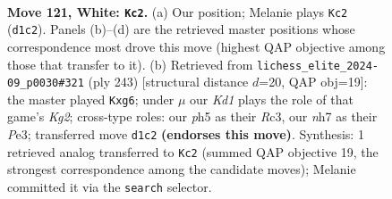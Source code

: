 \documentclass[11pt]{article}
\begin{document}
\begin{figure}[p]\centering
\begin{subfigure}{0.46\textwidth}\centering
\resizebox{\linewidth}{!}{%
\newchessgame
\chessboard[
  setfen={1R6/3r3n/8/4p2p/7b/7k/3p4/3K4 w - - 6 121},
  showmover=false,
  pgfstyle=straightmove, color=movearrow, markmove={d1-c2}
]}
\caption{}
\end{subfigure}\hfill
\begin{subfigure}{0.46\textwidth}\centering
\resizebox{\linewidth}{!}{%
\newchessgame
\chessboard[
  setfen={1R6/6k1/6P1/3B4/8/2r1p2P/8/3R2K1 b - - 0 122},
  showmover=false,
  pgfstyle=straightmove, color=movearrow, markmove={g7-g6}
]}
\caption{}
\end{subfigure}
\\[4pt]

\caption{\textbf{Move 121, White: \texttt{Kc2}.} (a) Our position; Melanie plays \texttt{Kc2} (\texttt{d1c2}). Panels (b)--(d) are the retrieved master positions whose correspondence most drove this move (highest QAP objective among those that transfer to it). (b) Retrieved from \texttt{lichess\_elite\_2024-09\_p0030\#321} (ply 243) [structural distance $d$=20, QAP obj=19]: the master played \texttt{Kxg6}; under $\mu$ our \emph{Kd1} plays the role of that game's \emph{Kg2}; cross-type roles: our \emph{p}h5 as their \emph{R}c3, our \emph{n}h7 as their \emph{P}e3; transferred move \texttt{d1c2} \textbf{(endorses this move)}. Synthesis: 1 retrieved analog transferred to \texttt{Kc2} (summed QAP objective 19, the strongest correspondence among the candidate moves); Melanie committed it via the \texttt{search} selector.}
\label{fig:thought-m240}
\end{figure}

\clearpage
\end{document}

